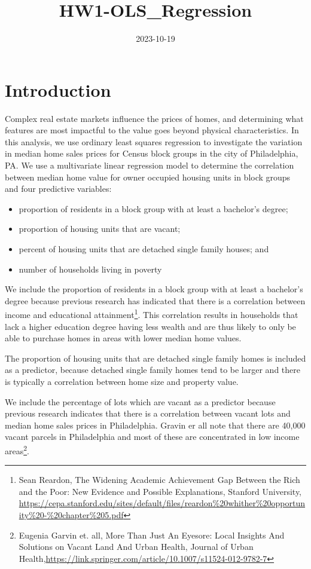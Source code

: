 \documentclass[
]{article}
\title{HW1-OLS\_Regression}
\author{}
\date{\vspace{-2.5em}2023-10-19}
\providecommand{\tightlist}{%
  \setlength{\itemsep}{0pt}\setlength{\parskip}{0pt}}
\begin{document}
\maketitle

\hypertarget{introduction}{%
\section{Introduction}\label{introduction}}

Complex real estate markets influence the prices of homes, and
determining what features are most impactful to the value goes beyond
physical characteristics. In this analysis, we use ordinary least
squares regression to investigate the variation in median home sales
prices for Census block groups in the city of Philadelphia, PA. We use a
multivariate linear regression model to determine the correlation
between median home value for owner occupied housing units in block
groups and four predictive variables:

\begin{itemize}
\tightlist
\item
  proportion of residents in a block group with at least a bachelor's
  degree;
\item
  proportion of housing units that are vacant;
\item
  percent of housing units that are detached single family houses; and
\item
  number of households living in poverty
\end{itemize}

We include the proportion of residents in a block group with at least a
bachelor's degree because previous research has indicated that there is
a correlation between income and educational attainment\footnote{Sean
  Reardon, The Widening Academic Achievement Gap Between the Rich and
  the Poor: New Evidence and Possible Explanations, Stanford University,
  \url{https://cepa.stanford.edu/sites/default/files/reardon\%20whither\%20opportunity\%20-\%20chapter\%205.pdf}}.
This correlation results in households that lack a higher education
degree having less wealth and are thus likely to only be able to
purchase homes in areas with lower median home values.

The proportion of housing units that are detached single family homes is
included as a predictor, because detached single family homes tend to be
larger and there is typically a correlation between home size and
property value.

We include the percentage of lots which are vacant as a predictor
because previous research indicates that there is a correlation between
vacant lots and median home sales prices in Philadelphia. Gravin er all
note that there are 40,000 vacant parcels in Philadelphia and most of
these are concentrated in low income areas\footnote{Eugenia Garvin et.
  all, More Than Just An Eyesore: Local Insights And Solutions on Vacant
  Land And Urban Health, Journal of Urban
  Health,\url{https://link.springer.com/article/10.1007/s11524-012-9782-7}}.
\end{document}
